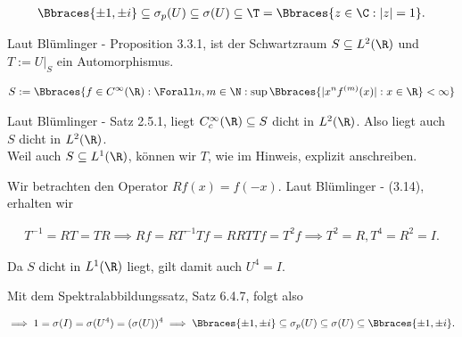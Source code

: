 \begin{solution}
\begin{align*}
  \Bbraces{\pm 1, \pm i}
  \subseteq
  \sigma_p(U)
  \subseteq
  \sigma(U)
  \subseteq
  \T
  =
  \Bbraces{z \in \C: |z| = 1}.
\end{align*}


Laut Blümlinger - Proposition 3.3.1, ist der Schwartzraum $S \subseteq L^2(\R)$ und $T := U|_S$ ein Automorphismus.

\begin{align*}
  S
  :=
  \Bbraces
  {
    f \in C^\infty(\R):
    \Forall n, m \in \N:
    \sup \Bbraces{|x^n f^{(m)}(x)| : x \in \R} < \infty
  }
\end{align*}


Laut Blümlinger - Satz 2.5.1, liegt $C_c^\infty(\R) \subseteq S$ dicht in $L^2(\R)$.
Also liegt auch $S$ dicht in $L^2(\R)$. \\

Weil auch $S \subseteq L^1(\R)$, können wir $T$, wie im Hinweis, explizit anschreiben. \\


Wir betrachten den Operator $R f(x) = f(-x)$.
Laut Blümlinger - (3.14), erhalten wir

\begin{align*}
  T^{-1} = R T = T R
  \implies
  R f = R T^{-1} T f = R R T T f = T^2 f
  \implies
  T^2 = R, T^4 = R^2 = I.
\end{align*}

Da $S$ dicht in $L^1(\R)$ liegt, gilt damit auch $U^4 = I$.


Mit dem Spektralabbildungssatz, Satz 6.4.7, folgt also

\begin{align*}
  \implies
  1 = \sigma(I) = \sigma(U^4) = (\sigma(U))^4
  \implies
  \Bbraces{\pm 1, \pm i}
  \subseteq
  \sigma_p(U)
  \subseteq
  \sigma(U)
  \subseteq
  \Bbraces{\pm 1, \pm i}.
\end{align*}

\end{solution}
